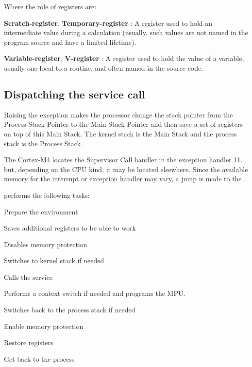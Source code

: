 Where the role of registers are:
\begin{penum}
\item \textbf{Scratch-register}, \textbf{Temporary-register} : A register used to hold an intermediate value during a calculation (usually, such values are not named in the program source and have a limited lifetime).
\item \textbf{Variable-register}, \textbf{V-register} : A register used to hold the value of a variable, usually one local to a routine, and often named in the source code.
\end{penum}

\subsection{Dispatching the service call}

Raising the  exception makes the processor change the stack pointer from the Process Stack Pointer to the Main Stack Pointer and then save a set of registers on top of this Main Stack.
The kernel stack is the Main Stack and the process stack is the Process Stack.

The Cortex-M4 locates the Supervisor Call handler in the exception handler 11. 
but, depending on the CPU kind, it may be located elsewhere. Since the available memory for the interrupt or exception handler may vary, a jump is made to the .%

 performs the following tasks:
\begin{penum}
\item Prepare the environment
\item Saves additional registers to be able to work
\item Disables memory protection
\item Switches to kernel stack if needed
\item Calls the service
\item Performs a context switch if needed and programs the MPU.
\item Switches back to the process stack if needed
\item Enable memory protection
\item Restore registers
\item Get back to the process
\end{penum}


